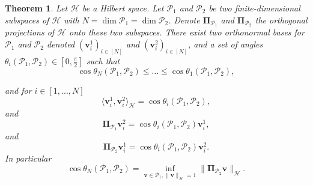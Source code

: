 \documentclass[twoside,11pt]{book}
\newtheorem{theorem}{Theorem}
\numberwithin{theorem}{chapter}
\numberwithin{definition}{chapter}
\numberwithin{proposition}{chapter}
\numberwithin{corollary}{chapter}
\numberwithin{example}{chapter}
\numberwithin{lemma}{chapter}
\numberwithin{assumption}{chapter}
\numberwithin{equation}{chapter}
\numberwithin{figure}{chapter}
\begin{document}
\begin{theorem}\label{prop:cos_between_subspaces}
Let $\mathcal{H}$ be a Hilbert space. Let $\mathcal{P}_{1}$ and $\mathcal{P}_{2}$ be two finite-dimensional subspaces of $\mathcal{H}$ with $N = \dim \mathcal{P}_{1} = \dim \mathcal{P}_{2}$. Denote $\bm{\Pi}_{\mathcal{P}_{1}}$ and $\bm{\Pi}_{\mathcal{P}_{2}}$ the orthogonal projections of $\mathcal{H}$ onto these two subspaces. There exist two orthonormal bases for $\mathcal{P}_{1}$ and $\mathcal{P}_{2}$ denoted $(\bm{v}_{i}^{1})_{i \in [N]}$ and $(\bm{v}_{i}^{2})_{i \in [N]}$, and a set of angles $\theta_{i}(\mathcal{P}_{1},\mathcal{P}_{2}) \in [0,\frac{\pi}{2}]$ such that
\begin{equation}
\cos \theta_{N}(\mathcal{P}_{1},\mathcal{P}_{2}) \leq \dots \leq \cos \theta_{1}(\mathcal{P}_{1},\mathcal{P}_{2}) ,
\end{equation}

and for $i \in [1,...,N]$
\begin{equation}
\langle \bm{v}_{i}^{1}, \bm{v}_{i}^{2} \rangle_{\mathcal{H}} = \cos \theta_{i}(\mathcal{P}_{1},\mathcal{P}_{2}),
\end{equation}
and
\begin{equation}\label{eq:principal_vectors_projection_relationship}
 \bm{\Pi}_{\mathcal{P}_{1}}\bm{v}_{i}^{2} = \cos \theta_{i}(\mathcal{P}_{1},\mathcal{P}_{2}) \bm{v}_{i}^{1},
\end{equation}
and
\begin{equation}
 \bm{\Pi}_{\mathcal{P}_{2}}\bm{v}_{i}^{1} = \cos \theta_{i}(\mathcal{P}_{1},\mathcal{P}_{2}) \bm{v}_{i}^{2}.
\end{equation}
In particular
\begin{equation}\label{eq:costhetaN}
\cos \theta_{N}(\mathcal{P}_{1},\mathcal{P}_{2}) = \inf\limits_{\bm{v} \in \mathcal{P}_{1},\|\bm{v}\|_{\mathcal{H}} = 1} \|\bm{\Pi}_{\mathcal{P}_{2}}\bm{v}\|_{\mathcal{H}}.
\end{equation}
\end{theorem}
\end{document}
